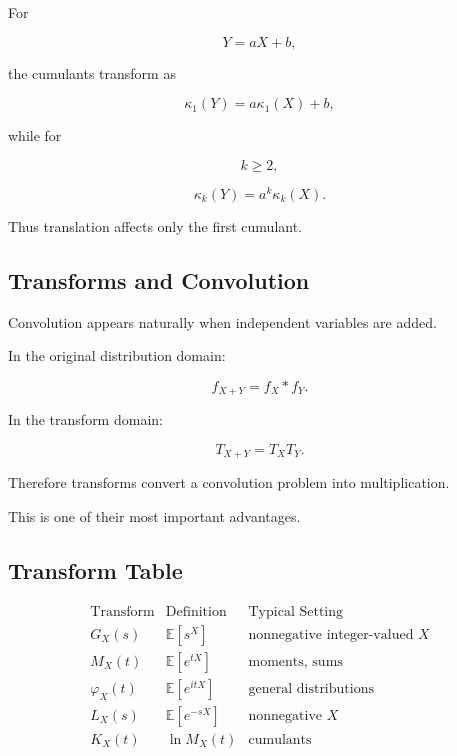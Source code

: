 For

\[
Y=aX+b,
\]

the cumulants transform as

\[
\boxed{
\kappa_1(Y)
=
a\kappa_1(X)+b,
}
\]

while for

\[
k\geq2,
\]

\[
\boxed{
\kappa_k(Y)
=
a^k\kappa_k(X).
}
\]

Thus translation affects only the first cumulant.

\subsection{Transforms and Convolution}
\label{subsec:transforms-and-convolution}

Convolution appears naturally when independent variables are added.

In the original distribution domain:

\[
\boxed{
f_{X+Y}
=
f_X*f_Y.
}
\]

In the transform domain:

\[
\boxed{
T_{X+Y}
=
T_XT_Y.
}
\]

Therefore transforms convert a convolution problem into multiplication.

This is one of their most important advantages.

\subsection{Transform Table}
\label{subsec:probability-transform-table}

\[
\begin{array}{c|c|c}
\text{Transform}
&
\text{Definition}
&
\text{Typical Setting}
\\
\hline
G_X(s)
&
\mathbb{E}[s^X]
&
\text{nonnegative integer-valued }X
\\[1mm]
M_X(t)
&
\mathbb{E}[e^{tX}]
&
\text{moments, sums}
\\[1mm]
\varphi_X(t)
&
\mathbb{E}[e^{itX}]
&
\text{general distributions}
\\[1mm]
L_X(s)
&
\mathbb{E}[e^{-sX}]
&
\text{nonnegative }X
\\[1mm]
K_X(t)
&
\ln M_X(t)
&
\text{cumulants}
\end{array}
\]

